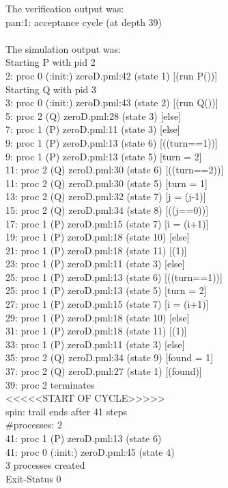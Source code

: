 \documentclass[12pt,a4paper]{scrartcl}
\begin{document}
The verification output was:\\
pan:1: acceptance cycle (at depth 39)\\
\\
The simulation output was:\\
Starting P with pid 2\\
  2:    proc  0 (:init:) zeroD.pml:42 (state 1) [(run P())]\\
Starting Q with pid 3\\
  3:    proc  0 (:init:) zeroD.pml:43 (state 2) [(run Q())]\\
  5:    proc  2 (Q) zeroD.pml:28 (state 3)  [else]\\
  7:    proc  1 (P) zeroD.pml:11 (state 3)  [else]\\
  9:    proc  1 (P) zeroD.pml:13 (state 6)  [((turn==1))]\\
  9:    proc  1 (P) zeroD.pml:13 (state 5)  [turn = 2]\\
 11:    proc  2 (Q) zeroD.pml:30 (state 6)  [((turn==2))]\\
 11:    proc  2 (Q) zeroD.pml:30 (state 5)  [turn = 1]\\
 13:    proc  2 (Q) zeroD.pml:32 (state 7)  [j = (j-1)]\\
 15:    proc  2 (Q) zeroD.pml:34 (state 8)  [((j==0))]\\
 17:    proc  1 (P) zeroD.pml:15 (state 7)  [i = (i+1)]\\
 19:    proc  1 (P) zeroD.pml:18 (state 10) [else]\\
 21:    proc  1 (P) zeroD.pml:18 (state 11) [(1)]\\
 23:    proc  1 (P) zeroD.pml:11 (state 3)  [else]\\
 25:    proc  1 (P) zeroD.pml:13 (state 6)  [((turn==1))]\\
 25:    proc  1 (P) zeroD.pml:13 (state 5)  [turn = 2]\\
 27:    proc  1 (P) zeroD.pml:15 (state 7)  [i = (i+1)]\\
 29:    proc  1 (P) zeroD.pml:18 (state 10) [else]\\
 31:    proc  1 (P) zeroD.pml:18 (state 11) [(1)]\\
 33:    proc  1 (P) zeroD.pml:11 (state 3)  [else]\\
 35:    proc  2 (Q) zeroD.pml:34 (state 9)  [found = 1]\\
 37:    proc  2 (Q) zeroD.pml:27 (state 1)  [(found)]\\
 39: proc 2 terminates\\
<<<<<START OF CYCLE>>>>>\\
spin: trail ends after 41 steps\\
\#processes: 2\\
 41:    proc  1 (P) zeroD.pml:13 (state 6)\\
 41:    proc  0 (:init:) zeroD.pml:45 (state 4)\\
3 processes created\\
Exit-Status 0\\
\end{document}
